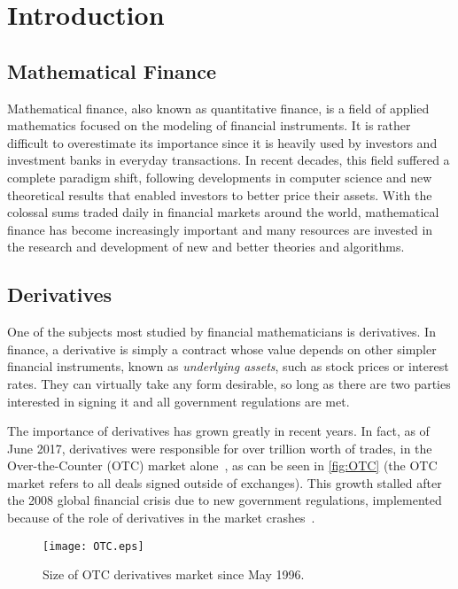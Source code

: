 \chapter{Introduction}
\label{chapter:introduction}
\section{Mathematical Finance}
\label{section:mathematical finance}
Mathematical finance, also known as quantitative finance, is a field of applied mathematics focused on the modeling of financial instruments.
It is rather difficult to overestimate its importance since it is heavily used by investors and investment banks in everyday transactions.
In recent decades, this field suffered a complete paradigm shift, following developments in computer science and new theoretical results that enabled investors to better price their assets.
With the colossal sums traded daily in financial markets around the world, mathematical finance has become increasingly important and many resources are invested in the research and development of new and better theories and algorithms.


\section{Derivatives}
\label{section:derivatives}
One of the subjects most studied by financial mathematicians is derivatives.
In finance, a derivative is simply a contract whose value depends on other simpler financial instruments, known as \emph{underlying assets}, such as stock prices or interest rates.
They can virtually take any form desirable, so long as there are two parties interested in signing it and all government regulations are met.


The importance of derivatives has grown greatly in recent years. In fact, as of June 2017, derivatives were responsible for over  trillion worth of trades, in the Over-the-Counter (OTC) market alone~\cite{BIS}, as can be seen in \autoref{fig:OTC} (the OTC market refers to all deals signed outside of exchanges).
This growth stalled after the 2008 global financial crisis due to new government regulations, implemented because of the role of derivatives in the market crashes~\cite{FT}. 


\begin{figure}[!htb]
    \centering
      \texttt{[image: OTC.eps]}
      \caption{Size of OTC derivatives market since May 1996.}\label{fig:OTC}
    \end{figure}

